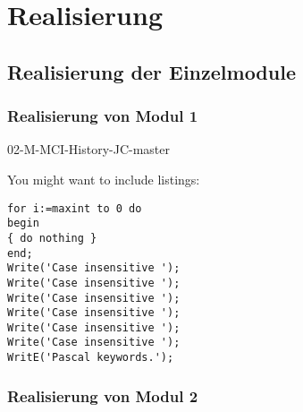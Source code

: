 \chapter{Realisierung}\label{chapter:realization}



\section{Realisierung der Einzelmodule}

\subsection{Realisierung von Modul 1}\label{subsec:real_module_1}02-M-MCI-History-JC-master




You might want to include listings:

\begin{illfloat}[H]
  \begin{lstlisting}
for i:=maxint to 0 do
begin
{ do nothing }
end;
Write('Case insensitive ');
Write('Case insensitive ');
Write('Case insensitive ');
Write('Case insensitive ');
Write('Case insensitive ');
Write('Case insensitive ');
WritE('Pascal keywords.');
  \end{lstlisting}%
\end{illfloat}

\subsection{Realisierung von Modul 2}\label{subsec:real_module_2}

